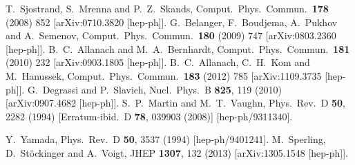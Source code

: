 \documentclass[final,3p,times,pdflatex]{elsarticle}
\begin{document}
\begin{thebibliography}{10}
  T.~Sjostrand, S.~Mrenna and P.~Z.~Skands,
  Comput.\ Phys.\ Commun.\  {\bf 178} (2008) 852
  [arXiv:0710.3820 [hep-ph]].
  G.~Belanger, F.~Boudjema, A.~Pukhov and A.~Semenov,
  Comput.\ Phys.\ Commun.\  {\bf 180} (2009) 747
  [arXiv:0803.2360 [hep-ph]].
  B.~C.~Allanach and M.~A.~Bernhardt,
  Comput.\ Phys.\ Commun.\  {\bf 181} (2010) 232
  [arXiv:0903.1805 [hep-ph]].
  B.~C.~Allanach, C.~H.~Kom and M.~Hanussek,
  Comput.\ Phys.\ Commun.\  {\bf 183} (2012) 785
  [arXiv:1109.3735 [hep-ph]].
  G.~Degrassi and P.~Slavich,
  Nucl.\ Phys.\ B {\bf 825}, 119 (2010)
  [arXiv:0907.4682 [hep-ph]].
  S.~P.~Martin and M.~T.~Vaughn,
  Phys.\ Rev.\ D {\bf 50}, 2282 (1994)
  [Erratum-ibid.\ D {\bf 78}, 039903 (2008)]
  [hep-ph/9311340].

  Y.~Yamada,
  Phys.\ Rev.\ D {\bf 50}, 3537 (1994)
  [hep-ph/9401241].
  M.~Sperling, D.~St\"ockinger and A.~Voigt,
  JHEP {\bf 1307}, 132 (2013)
  [arXiv:1305.1548 [hep-ph]].


\end{thebibliography}
\end{document}
